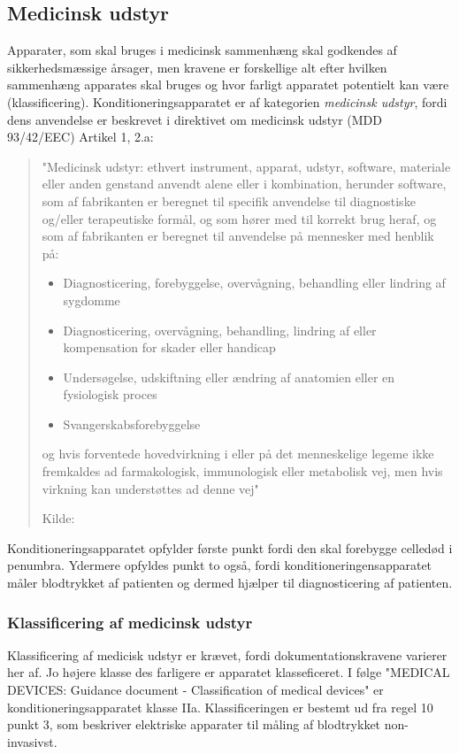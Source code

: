 \subsection{Medicinsk udstyr}
Apparater, som skal bruges i medicinsk sammenhæng skal godkendes af sikkerhedsmæssige årsager, men kravene er forskellige alt efter hvilken sammenhæng apparates skal bruges og hvor farligt apparatet potentielt kan være (klassificering). Konditioneringsapparatet er af kategorien \textit{medicinsk udstyr}, fordi dens anvendelse er beskrevet i direktivet om medicinsk udstyr (MDD 93/42/EEC) Artikel 1, 2.a:

\begin{quote}
	"Medicinsk udstyr: ethvert instrument, apparat, udstyr, software,
	materiale eller anden genstand anvendt alene eller i kombination,
	herunder software, som af fabrikanten er beregnet til specifik anvendelse
	til diagnostiske og/eller terapeutiske formål, og som hører med
	til korrekt brug heraf, og som af fabrikanten er beregnet til anvendelse
	på mennesker med henblik på:
	\begin{itemize}
		\item Diagnosticering, forebyggelse, overvågning, behandling eller
		lindring af sygdomme
		\item Diagnosticering, overvågning, behandling, lindring af eller
		kompensation for skader eller handicap
		\item Undersøgelse, udskiftning eller ændring af anatomien eller en
		fysiologisk proces
		\item Svangerskabsforebyggelse
	\end{itemize}
	
	og hvis forventede hovedvirkning i eller på det menneskelige
	legeme ikke fremkaldes ad farmakologisk, immunologisk eller metabolisk
	vej, men hvis virkning kan understøttes ad denne vej"
	
	Kilde:  
\end{quote}

Konditioneringsapparatet opfylder første punkt fordi den skal forebygge celledød i penumbra. Ydermere opfyldes punkt to også, fordi konditioneringensapparatet måler blodtrykket af patienten og dermed hjælper til diagnosticering af patienten.

\subsubsection{Klassificering af medicinsk udstyr}
Klassificering af medicisk udstyr er krævet, fordi dokumentationskravene varierer her af. Jo højere klasse des farligere er apparatet klasseficeret. I følge "MEDICAL DEVICES: Guidance document - Classification of medical devices" er konditioneringsapparatet klasse IIa. Klassificeringen er bestemt ud fra regel 10 punkt 3, som beskriver elektriske apparater til måling af blodtrykket non-invasivst.

